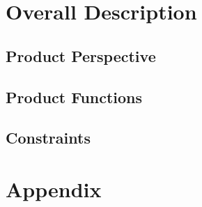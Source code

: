 \documentclass[a4paper,12pt]{report}
\begin{document}
\chapter{Overall Description}
\label{ch:Overall Description}

\section{Product Perspective}


\section{Product Functions}


\section{Constraints}


\appendix
\chapter{Appendix}



\end{document}
